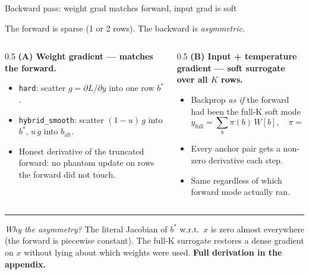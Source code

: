 \documentclass[aspectratio=169]{beamer}
\newcommand{\bstar}{b^{*}}
\newcommand{\Tsel}{T_{\mathrm{sel}}}
\newcommand{\softmax}{\operatorname{softmax}}
\begin{document}
\begin{frame}{Backward pass: weight grad matches forward, input grad is soft}

The forward is sparse (1 or 2 rows). The backward is \emph{asymmetric}.

\medskip
\begin{columns}[T,onlytextwidth]
\begin{column}{0.5\textwidth}
\textbf{(A) Weight gradient --- matches the forward.}
\begin{itemize}
\item \texttt{hard}: scatter \(g = \partial L/\partial y\) into one row \(\bstar\).
\item \texttt{hybrid\_smooth}: scatter \((1{-}u)\, g\) into \(\bstar\), \(u\, g\) into \(b_{\mathrm{alt}}\).
\item Honest derivative of the truncated forward: no phantom update on rows the forward did not touch.
\end{itemize}
\end{column}
\begin{column}{0.5\textwidth}
\textbf{(B) Input + temperature gradient --- soft surrogate over all \(K\) rows.}
\begin{itemize}
\item Backprop \emph{as if} the forward had been the full-K soft mode
\[ y_{\mathrm{full}} = \sum_{b} \pi(b)\, W[b], \quad \pi = \softmax(\mathcal{S}/\Tsel). \]
\item Every anchor pair gets a non-zero derivative each step.
\item Same regardless of which forward mode actually ran.
\end{itemize}
\end{column}
\end{columns}

\medskip
\hrule
\vspace{0.4em}
\small\emph{Why the asymmetry?} The literal Jacobian of \(\bstar\) w.r.t.\ \(x\) is zero almost everywhere (the forward is piecewise constant). The full-K surrogate restores a dense gradient on \(x\) without lying about which weights were used. \textbf{Full derivation in the appendix.}
\end{frame}
\end{document}
